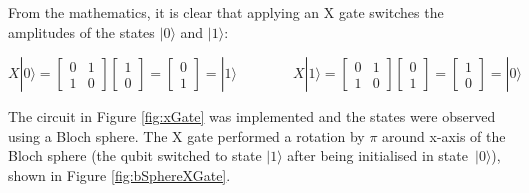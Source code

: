 From the mathematics, it is clear that applying an X gate switches the amplitudes of the states $|0\rangle$ and $|1\rangle$:

$$ X|0\rangle = \begin{bmatrix} 0 & 1 \\ 1 & 0 \end{bmatrix}\begin{bmatrix} 1 \\ 0 \end{bmatrix} = \begin{bmatrix} 0 \\ 1 \end{bmatrix} = |1\rangle \quad\quad\quad\quad
X|1\rangle = \begin{bmatrix} 0 & 1 \\ 1 & 0 \end{bmatrix}\begin{bmatrix} 0 \\ 1 \end{bmatrix} = \begin{bmatrix} 1 \\ 0 \end{bmatrix} = |0\rangle$$

The circuit in Figure \ref{fig:xGate} was implemented and the states were observed using a Bloch sphere.  The X gate performed a rotation by $\pi$ around x-axis of the Bloch sphere (the qubit switched to state $|1\rangle$ after being initialised in state~$|0\rangle$), shown in Figure \ref{fig:bSphereXGate}.

